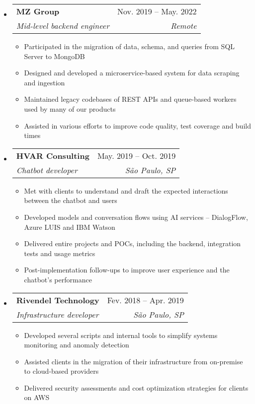 \documentclass[letterpaper,12pt]{article}[leftmargin=*]
\makeatletter
\def \entryspacing {-0pt}
\newcommand{\resumeEntryStart}{\begin{itemize}[leftmargin=2.5mm]}
\newcommand{\resumeEntryEnd}{\end{itemize}\vspace{\entryspacing}}
\newcommand{\resumeItemListStart}{\begin{itemize}[leftmargin=4.5mm]}
\newcommand{\resumeItemListEnd}{\end{itemize}}
\newcommand{\resumeItem}[1]{
  \item\small{
    {#1 \vspace{-2pt}}
  }
}
\newcommand{\resumeEntryTSDL}[4]{
  \vspace{-1pt}\item[]
    \begin{tabularx}{0.97\textwidth}{X@{\hspace{60pt}}r}
      \textbf{\color{primary}#1} & {\firabook\color{accent}\small#2} \\
      \textit{\color{accent}\small#3} & \textit{\color{accent}\small#4} \\
    \end{tabularx}\vspace{-6pt}
}
\makeatother
\begin{document}
  \resumeEntryStart
    \resumeEntryTSDL
      {MZ Group}{Nov. 2019 -- May. 2022}
      {Mid-level backend engineer}{Remote}
    \resumeItemListStart
      \resumeItem {Participated in the migration of data, schema, and queries from SQL Server to MongoDB}
      \resumeItem {Designed and developed a microservice-based system for data scraping and ingestion}
      \resumeItem {Maintained legacy codebases of REST APIs and queue-based workers used by many of our products}
      \resumeItem {Assisted in various efforts to improve code quality, test coverage and build times}
    \resumeItemListEnd
  \resumeEntryEnd

  \resumeEntryStart
    \resumeEntryTSDL
      {HVAR Consulting}{May. 2019 -- Oct. 2019}
      {Chatbot developer}{São Paulo, SP}
    \resumeItemListStart
        \resumeItem {Met with clients to understand and draft the expected interactions between the chatbot and users}
        \resumeItem {Developed models and conversation flows using AI services -- DialogFlow, Azure LUIS and IBM Watson}
        \resumeItem {Delivered entire projects and POCs, including the backend, integration tests and usage metrics}
        \resumeItem {Post-implementation follow-ups to improve user experience and the chatbot's performance}
    \resumeItemListEnd
  \resumeEntryEnd

  \resumeEntryStart
    \resumeEntryTSDL
      {Rivendel Technology}{Fev. 2018 -- Apr. 2019}
      {Infrastructure developer}{São Paulo, SP}
    \resumeItemListStart
      \resumeItem {Developed several scripts and internal tools to simplify systems monitoring and anomaly detection}
      \resumeItem {Assisted clients in the migration of their infrastructure from on-premise to cloud-based providers}
      \resumeItem {Delivered security assessments and cost optimization strategies for clients on AWS}
    \resumeItemListEnd
  \resumeEntryEnd
\end{document}
